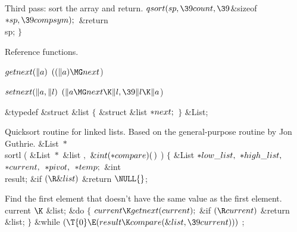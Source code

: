 Third pass: sort the array and return.
\Y\B$\\{qsort}(\\{sp},\39\\{count},\39{}$\&{sizeof} ${}{*}\\{sp},\39%
\\{compsym});{}$\6
\&{return} \\{sp}; $\}{}$\par
\fi

Reference functions.

\Y\B\4\D$\\{getnext}(\|a)$ \5
$((\|a)\MG\\{next}{}$)\par
\B\4\D$\\{setnext}(\|a,\|l)$ \5
$(\|a\MG\\{next}\K\|l,\39\|l\K\|a{}$)\par
\Y\B\&{typedef} \&{struct} \&{list} ${}\{{}$\1\6
\&{struct} \&{list} ${}{*}\\{next};{}$\2\6
${}\}{}$ \&{List};\par
\fi

Quicksort routine for linked lists. Based on the general-purpose routine
by Jon Guthrie.
\Y\B\&{List} ${}{*}$ \\{sortl} ( \&{List} ${}{*}{}$\1\1 \&{list} $,$ $%
\&{int}({*}\\{compare})(\,)$ ) $\{$ \&{List} ${}{*}\\{low\_list},{}$ ${}{*}%
\\{high\_list},{}$ ${}{*}\\{current},{}$ ${}{*}\\{pivot},{}$ ${}{*}\\{temp};{}$%
\6
\&{int} \\{result};\7
\&{if} ${}(\R\&{list}){}$\1\5
\&{return} ${}\NULL{}$;\2\par
\fi

Find the first element that doesn't have the same value as the first
element.
\Y\B\\{current} $\K$ \&{list}; \&{do} $\{$ $\\{current}\K\\{getnext}(%
\\{current});$ \&{if} ${}(\R\\{current})$ \&{return} \&{list}; $\}$ \6
\&{while} ${}(\T{0}\E(\\{result}\K\\{compare}(\&{list},\39\\{current}))){}$\1\5
;\2\par
\fi

